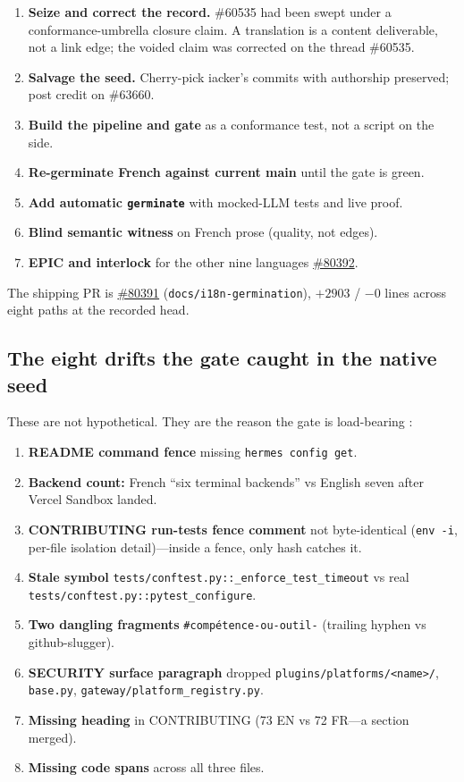 \documentclass[11pt]{article}
\theoremstyle{definition}
\theoremstyle{plain}
\theoremstyle{remark}
\begin{document}
\begin{enumerate}[leftmargin=*]
\item \textbf{Seize and correct the record.} \#60535 had been swept under a
  conformance-umbrella closure claim. A translation is a content deliverable,
  not a link edge; the voided claim was corrected on the thread
  \citep{hermes60535}{\#60535}.
\item \textbf{Salvage the seed.} Cherry-pick iacker's commits with authorship
  preserved; post credit on \#63660.
\item \textbf{Build the pipeline and gate} as a conformance test, not a
  script on the side.
\item \textbf{Re-germinate French against current main} until the gate is
  green.
\item \textbf{Add automatic \texttt{germinate}} with mocked-LLM tests and
  live proof.
\item \textbf{Blind semantic witness} on French prose (quality, not
  edges).
\item \textbf{EPIC and interlock} for the other nine languages
  \href{https://github.com/NousResearch/hermes-agent/issues/80392}{\#80392}.
\end{enumerate}

The shipping PR is
\href{https://github.com/NousResearch/hermes-agent/pull/80391}{\#80391}
(\texttt{docs/i18n-germination}), $+2903$ / $-0$ lines across eight paths at
the recorded head.

\subsection{The eight drifts the gate caught in the native seed}

These are not hypothetical. They are the reason the gate is load-bearing
\citep{docsgermskill,hermespr80391}:

\begin{enumerate}[leftmargin=*]
\item \textbf{README command fence} missing \texttt{hermes config get}.
\item \textbf{Backend count:} French ``six terminal backends'' vs English
  seven after Vercel Sandbox landed.
\item \textbf{CONTRIBUTING run-tests fence comment} not byte-identical
  (\texttt{env -i}, per-file isolation detail)---inside a fence, only hash
  catches it.
\item \textbf{Stale symbol}
  \texttt{tests/conftest.py::\_enforce\_test\_timeout} vs real
  \texttt{tests/conftest.py::pytest\_configure}.
\item \textbf{Two dangling fragments}
  \texttt{\#comp\'etence-ou-outil-} (trailing hyphen vs github-slugger).
\item \textbf{SECURITY surface paragraph} dropped
  \texttt{plugins/platforms/<name>/}, \texttt{base.py},
  \texttt{gateway/platform\_registry.py}.
\item \textbf{Missing heading} in CONTRIBUTING (73 EN vs 72 FR---a section
  merged).
\item \textbf{Missing code spans} across all three files.
\end{enumerate}
\end{document}
